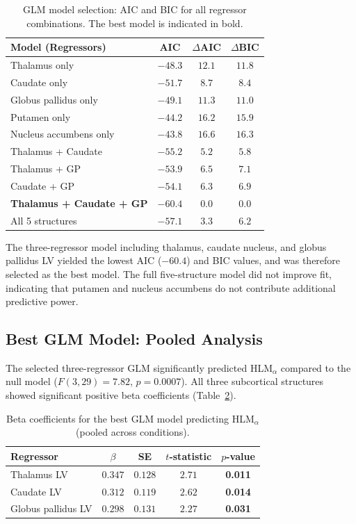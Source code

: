 \documentclass[11pt]{article}
\begin{document}
\begin{table}[H]
\centering
\caption{GLM model selection: AIC and BIC for all regressor combinations. The best model is indicated in bold.}
\label{tab:model_selection}
\begin{tabular}{@{}lccc@{}}
\toprule
Model (Regressors) & AIC & $\Delta$AIC & $\Delta$BIC \\
\midrule
Thalamus only & $-48.3$ & $12.1$ & $11.8$ \\
Caudate only & $-51.7$ & $8.7$ & $8.4$ \\
Globus pallidus only & $-49.1$ & $11.3$ & $11.0$ \\
Putamen only & $-44.2$ & $16.2$ & $15.9$ \\
Nucleus accumbens only & $-43.8$ & $16.6$ & $16.3$ \\
Thalamus + Caudate & $-55.2$ & $5.2$ & $5.8$ \\
Thalamus + GP & $-53.9$ & $6.5$ & $7.1$ \\
Caudate + GP & $-54.1$ & $6.3$ & $6.9$ \\
\textbf{Thalamus + Caudate + GP} & $\mathbf{-60.4}$ & $\mathbf{0.0}$ & $\mathbf{0.0}$ \\
All 5 structures & $-57.1$ & $3.3$ & $6.2$ \\
\bottomrule
\end{tabular}
\end{table}

The three-regressor model including thalamus, caudate nucleus, and globus pallidus LV yielded the lowest AIC ($-60.4$) and BIC values, and was therefore selected as the best model. The full five-structure model did not improve fit, indicating that putamen and nucleus accumbens do not contribute additional predictive power.

\subsection{Best GLM Model: Pooled Analysis}

The selected three-regressor GLM significantly predicted HLM$_\alpha$ compared to the null model ($F(3, 29) = 7.82$, $p = 0.0007$). All three subcortical structures showed significant positive beta coefficients (Table~\ref{tab:betas}).

\begin{table}[H]
\centering
\caption{Beta coefficients for the best GLM model predicting HLM$_\alpha$ (pooled across conditions).}
\label{tab:betas}
\begin{tabular}{@{}lcccc@{}}
\toprule
Regressor & $\beta$ & SE & $t$-statistic & $p$-value \\
\midrule
Thalamus LV & $0.347$ & $0.128$ & $2.71$ & \textbf{0.011} \\
Caudate LV & $0.312$ & $0.119$ & $2.62$ & \textbf{0.014} \\
Globus pallidus LV & $0.298$ & $0.131$ & $2.27$ & \textbf{0.031} \\
\bottomrule
\end{tabular}
\end{table}
\end{document}
